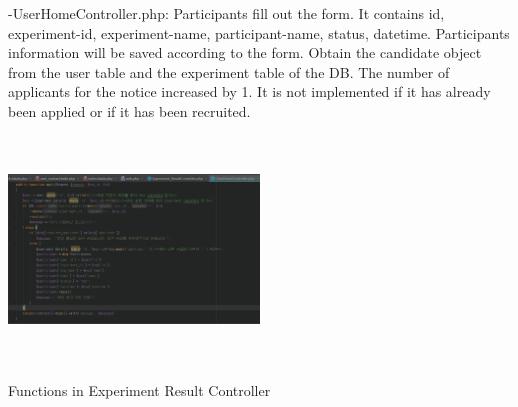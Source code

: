\documentclass[letterpaper, 10 pt, conference]{ieeeconf}  %
\begin{document}
-UserHomeController.php: Participants fill out the form. It contains id, experiment-id, experiment-name, participant-name, status, datetime. Participants information will be saved according to the form. Obtain the candidate object from the user table and the experiment table of the DB. The number of applicants for the notice increased by 1. It is not implemented if it has already been applied or if it has been recruited.
\begin{center}
\includegraphics[width=0.5\textwidth,height = 6cm]{class/11.png}
\end{center}

Functions in Experiment Result Controller
\end{document}
